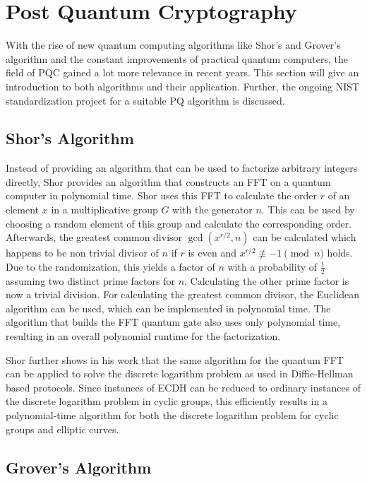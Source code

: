 \section{Post Quantum Cryptography}

With the rise of new quantum computing algorithms like Shor's and Grover's algorithm and the constant improvements of practical quantum computers, the field of \ac{PQC} gained a lot more relevance in recent years. This section will give an introduction to both algorithms and their application. Further, the ongoing \ac{NIST} standardization project for a suitable \ac{PQ} algorithm is discussed.


\subsection{Shor's Algorithm}

Instead of providing an algorithm that can be used to factorize arbitrary integers directly, Shor provides an algorithm that constructs an \ac{FFT} on a quantum computer in polynomial time. Shor uses this \ac{FFT} to calculate the order \(r\) of an element \(x\) in a multiplicative group \(G\) with the generator \(n\). This can be used by choosing a random element of this group and calculate the corresponding order. Afterwards, the greatest common divisor \(\gcd(x^{r/2},n)\) can be calculated which happens to be non trivial divisor of \(n\) if \(r\) is even and \(x^{r/2} \not\equiv -1 \pmod{n} \) holds. Due to the randomization, this yields a factor of \(n\) with a probability of \(\frac{1}{2}\) assuming two distinct prime factors for \(n\). Calculating the other prime factor is now a trivial division. For calculating the greatest common divisor, the Euclidean algorithm can be used, which can be implemented in polynomial time. The algorithm that builds the \ac{FFT} quantum gate also uses only polynomial time, resulting in an overall polynomial runtime for the factorization\cite{shor1999polynomial}.

Shor further shows in his work that the same algorithm for the quantum \ac{FFT} can be applied to solve the discrete logarithm problem as used in Diffie-Hellman based protocols. Since instances of \ac{ECDH} can be reduced to ordinary instances of the discrete logarithm problem in cyclic groups, this efficiently results in a polynomial-time algorithm for both the discrete logarithm problem for cyclic groups and elliptic curves.

\subsection{Grover's Algorithm}

